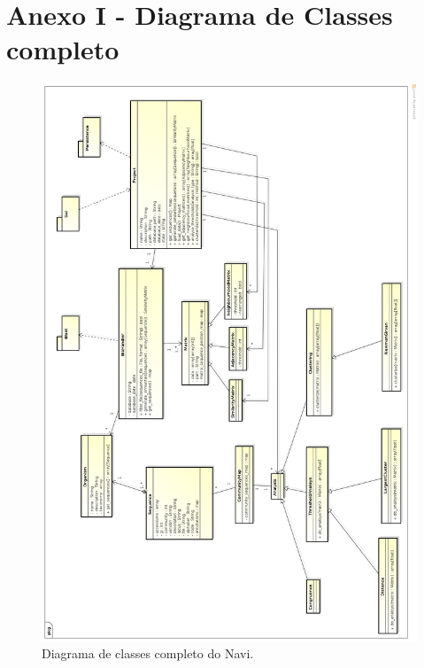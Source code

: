 \appendix

\chapter{Anexo I - Diagrama de Classes completo}

\begin{figure}
\centering
\includegraphics[scale=0.28]{diagrama-classes-completo}
\caption{Diagrama de classes completo do Navi.}
\label{fig:diagrama-classes-completo}
\end{figure}
